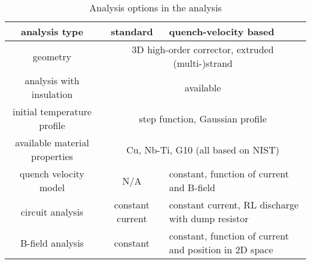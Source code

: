 \begin{table}[H]
    \caption{Analysis options in the analysis} 
    \vspace{-1.em} 
    \fontsize{10}{10}
    \selectfont 
    \renewcommand{\arraystretch}{1.5}
    \begin{center}
        \begin{tabular}{ c | c | m{5cm} }  
        \hline
        \textbf{analysis type} & \textbf{standard} & \textbf{quench-velocity based} \\
        \hline
        geometry & \multicolumn{2}{c}{3D high-order corrector,  extruded (multi-)strand} \\
        \hline
        analysis with insulation & \multicolumn{2}{c}{available} \\
        \hline
        initial temperature profile & \multicolumn{2}{c}{step function, Gaussian profile} \\
        \hline
        available material properties & \multicolumn{2}{c}{Cu, Nb-Ti, G10 (all based on NIST)} \\
        \hline
        quench velocity model & N/A & constant, function of current and B-field \\
        \hline
        circuit analysis & constant current & constant current, RL discharge with dump resistor \\ 
        \hline
        B-field analysis & constant & constant, function of current and position in 2D space
        \end{tabular}
    \end{center}  
     \label{table:python_analysis_options} 
 \end{table}
